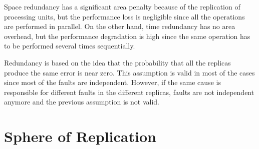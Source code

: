 Space redundancy has a significant area penalty because of the replication of processing units, but the performance loss is negligible since all the operations are performed in parallel. On the other hand, time redundancy has no area overhead, but the performance degradation is high since the same operation has to be performed several times sequentially.

Redundancy is based on the idea that the probability that all the replicas produce the same error is near zero. This assumption is valid in most of the cases since most of the faults are independent. However, if the same cause is responsible for different faults in the different replicas, faults are not independent anymore and the previous assumption is not valid.

\bigskip


\section{Sphere of Replication}
\bigskip
